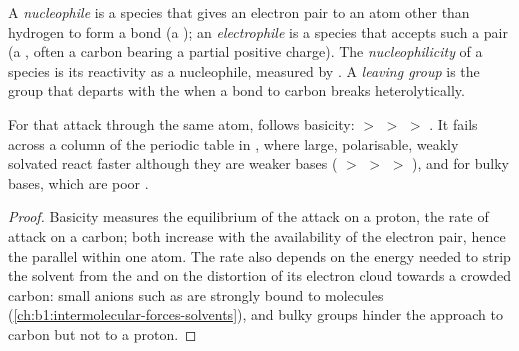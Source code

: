 \begin{definition}\label{def:b1:electronic-effects:nucleophile}
A \emph{nucleophile} is a species that gives an
electron pair to an atom other than hydrogen to form a bond (a ); an \emph{electrophile} is a species that
accepts such a pair (a , often a carbon bearing a partial
positive charge). The \emph{nucleophilicity} of a
species is its reactivity as a nucleophile, measured by .
A \emph{leaving group} is the group that departs
with the  when a bond to carbon breaks heterolytically.
\end{definition}

\begin{proposition}\label{prop:b1:electronic-effects:nucleophilicity-basicity}
For  that attack through the same atom, 
follows basicity:  $>$  $>$  $>$ . It
fails across a column of the periodic table in , where
large, polarisable, weakly solvated  react faster although they
are weaker bases ( $>$  $>$  $>$ ), and for
bulky bases, which are poor .
\end{proposition}

\begin{proof}
Basicity measures the equilibrium of the attack on a proton,
 the rate of attack on a carbon; both increase with the
availability of the electron pair, hence the parallel within one atom.
The rate also depends on the energy needed to strip the solvent from the
 and on the distortion of its electron cloud towards a
crowded carbon: small anions such as  are strongly bound to  molecules (\cref{ch:b1:intermolecular-forces-solvents}), and
bulky groups hinder the approach to carbon but not to a proton.
\end{proof}

